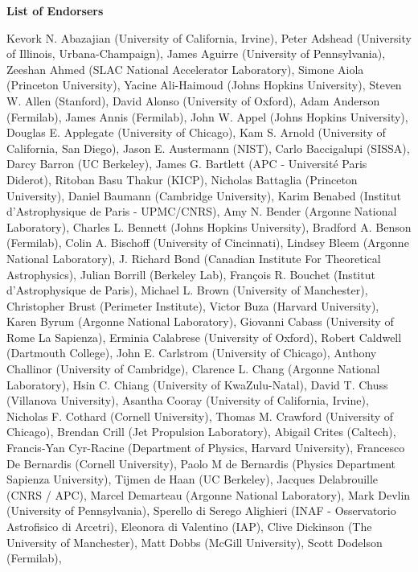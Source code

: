 \begin{center}
\textbf{List of Endorsers}
\end{center}
Kevork N. Abazajian (University of California, Irvine),
Peter Adshead (University of Illinois, Urbana-Champaign),
James Aguirre (University of Pennsylvania),
Zeeshan Ahmed (SLAC National Accelerator Laboratory),
Simone Aiola (Princeton University),
Yacine Ali-Haimoud (Johns Hopkins University),
Steven W. Allen (Stanford),
David Alonso (University of Oxford),
Adam Anderson (Fermilab),
James Annis (Fermilab),
John W. Appel (Johns Hopkins University),
Douglas E. Applegate (University of Chicago),
Kam S. Arnold (University of California, San Diego),
Jason E. Austermann (NIST),
Carlo Baccigalupi (SISSA),
Darcy Barron (UC Berkeley),
James G. Bartlett (APC - Université Paris Diderot),
Ritoban Basu Thakur (KICP),
Nicholas Battaglia (Princeton University),
Daniel Baumann (Cambridge University),
Karim Benabed (Institut d'Astrophysique de Paris - UPMC/CNRS),
Amy N. Bender (Argonne National Laboratory),
Charles L. Bennett (Johns Hopkins University),
Bradford A. Benson (Fermilab),
Colin A. Bischoff (University of Cincinnati),
Lindsey Bleem (Argonne National Laboratory),
J. Richard Bond (Canadian Institute For Theoretical Astrophysics),
Julian Borrill (Berkeley Lab),
François R. Bouchet (Institut d'Astrophysique de Paris),
Michael L. Brown (University of Manchester),
Christopher Brust (Perimeter Institute),
Victor Buza (Harvard University),
Karen Byrum (Argonne National Laboratory),
Giovanni Cabass (University of Rome La Sapienza),
Erminia Calabrese (University of Oxford),
Robert Caldwell (Dartmouth College),
John E. Carlstrom (University of Chicago),
Anthony Challinor (University of Cambridge),
Clarence L. Chang (Argonne National Laboratory),
Hsin C. Chiang (University of KwaZulu-Natal),
David T. Chuss (Villanova University),
Asantha Cooray (University of California, Irvine),
Nicholas F. Cothard (Cornell University),
Thomas M. Crawford (University of Chicago),
Brendan Crill (Jet Propulsion Laboratory),
Abigail Crites (Caltech),
Francis-Yan Cyr-Racine (Department of Physics, Harvard University),
Francesco De Bernardis (Cornell University),
Paolo M de Bernardis (Physics Department Sapienza University),
Tijmen de Haan (UC Berkeley),
Jacques Delabrouille (CNRS / APC),
Marcel Demarteau (Argonne National Laboratory),
Mark Devlin (University of Pennsylvania),
Sperello di Serego Alighieri (INAF - Osservatorio Astrofisico di Arcetri),
Eleonora di Valentino (IAP),
Clive Dickinson (The University of Manchester),
Matt Dobbs (McGill University),
Scott Dodelson (Fermilab),
